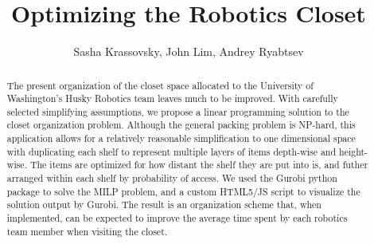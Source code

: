 \documentclass[10pt]{article}
\title{Optimizing the Robotics Closet}
\author{Sasha Krassovsky, John Lim, Andrey Ryabtsev}
\theoremstyle{named}
\begin{document}
\maketitle
\begin{abstract}
The present organization of the closet space allocated to the University of Washington's Husky Robotics team leaves much to be improved. With carefully selected simplifying assumptions, we propose a linear programming solution to the closet organization problem. Although the general packing problem is NP-hard, this application allows for a relatively reasonable simplification to one dimensional space with duplicating each shelf to represent multiple layers of items depth-wise and height-wise. The items are optimized for how distant the shelf they are put into is, and futher arranged within each shelf by probability of access. We used the Gurobi python package to solve the MILP problem, and a custom HTML5/JS script to visualize the solution output by Gurobi. The result is an organization scheme that, when implemented, can be expected to improve the average time spent by each robotics team member when visiting the closet.
\end{abstract}
\pagebreak
\end{document}
